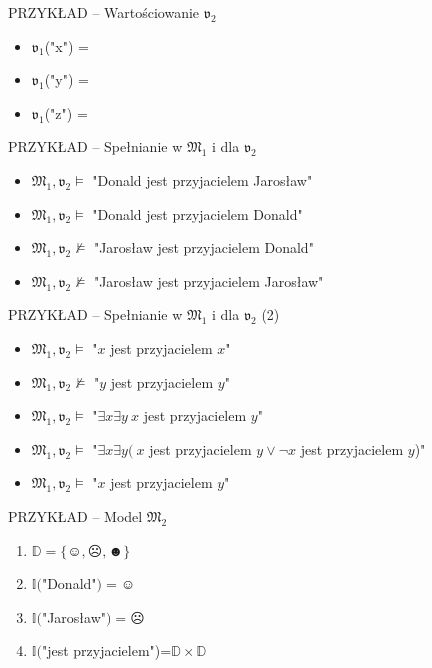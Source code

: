 \documentclass{beamer}
\begin{document}
\begin{frame}{PRZYKŁAD -- Wartościowanie $\mathfrak{v}_2$}
%
\begin{itemize}
\item $\mathfrak{v}_1$("x") = \smiley{}
\item $\mathfrak{v}_1$("y") = \frownie{}
\item $\mathfrak{v}_1$("z") = \blacksmiley{}
\end{itemize}
\end{frame}

\begin{frame}{PRZYKŁAD -- Spełnianie w $\mathfrak{M}_1$ i dla $\mathfrak{v}_2$}
%
\begin{itemize}
\item $\mathfrak{M}_1,\mathfrak{v}_2 \vDash$ "Donald jest przyjacielem Jarosław"%
\item $\mathfrak{M}_1,\mathfrak{v}_2 \vDash$ "Donald jest przyjacielem Donald"%
\item $\mathfrak{M}_1,\mathfrak{v}_2 \not \vDash$ "Jarosław jest przyjacielem Donald"%
\item $\mathfrak{M}_1,\mathfrak{v}_2 \not \vDash$ "Jarosław jest przyjacielem Jarosław"
\end{itemize}
\end{frame}

\begin{frame}{PRZYKŁAD -- Spełnianie w $\mathfrak{M}_1$ i dla $\mathfrak{v}_2$ (2)}
%
\begin{itemize}
\item $\mathfrak{M}_1,\mathfrak{v}_2 \vDash$ "$x$ jest przyjacielem $x$"%
\item $\mathfrak{M}_1,\mathfrak{v}_2 \not \vDash$ "$y$ jest przyjacielem $y$"%
\item $\mathfrak{M}_1,\mathfrak{v}_2 \vDash$ "$\exists x \exists y ~x$ jest przyjacielem $y$"%
\item $\mathfrak{M}_1,\mathfrak{v}_2 \vDash$ "$\exists x \exists y ( ~x$ jest przyjacielem $y \lor \neg x$ jest przyjacielem $y$)"%
\item $\mathfrak{M}_1,\mathfrak{v}_2 \vDash$ "$x$ jest przyjacielem $y$"
\end{itemize}
\end{frame}

\begin{frame}{PRZYKŁAD -- Model $\mathfrak{M}_2$}
%
\begin{enumerate}
    \item $\mathbb{D} = \{\smiley{}, \frownie{}, \blacksmiley{} \}$%
    \item $\mathbb{I}($"Donald"$)=\smiley{}$%
    \item $\mathbb{I}($"Jarosław"$)=\frownie{}$%
    \item $\mathbb{I}($"jest przyjacielem")=$\mathbb{D} \times \mathbb{D}$
\end{enumerate}
\end{frame}
\end{document}
